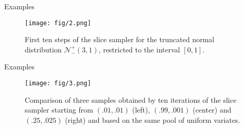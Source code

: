 \documentclass{beamer}
\begin{document}
\begin{frame}{Examples}
	\begin{figure}[htbp]
		\texttt{[image: fig/2.png]}
		\caption{First ten steps of the slice sampler for the truncated normal distribution $\mathcal{N}_{-}^{+}(3, 1)$, restricted to the interval $[0, 1]$.}
	\end{figure}
\end{frame}
	\begin{frame}{Examples}
	\begin{figure}[htbp]
			\texttt{[image: fig/3.png]}
			\caption{Comparison of three samples obtained by ten iterations of the slice sampler starting from $(.01, .01)$ (left), $(.99, .001)$ (center) and $(.25, .025)$ (right) and based on the same pool of uniform variates.}
	\end{figure}
	\end{frame}
\end{document}
